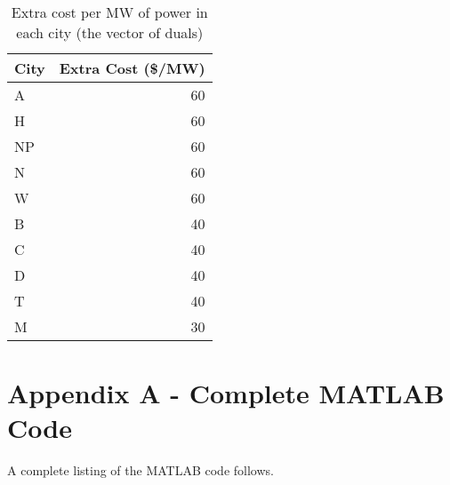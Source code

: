 \documentclass[11pt]{article}
\begin{document}
\begin{table}[h]
	\centering
	\begin{tabular}{@{}lr@{}}
	\toprule
	City & Extra Cost (\$/MW) \\ \midrule
	A       & 60              \\
	H       & 60              \\
	NP      & 60              \\
	N       & 60              \\
	W       & 60              \\
	B       & 40              \\
	C       & 40              \\
	D       & 40              \\
	T       & 40              \\
	M       & 30              \\ \bottomrule
	\end{tabular}
	\caption{Extra cost per MW of power in each city (the vector of duals)}
\end{table}

\newpage\phantom{hi marker :)}

\newpage
\section*{Appendix A - Complete MATLAB Code}
A complete listing of the MATLAB code follows. 

\inputminted{matlab}{main.m}
\end{document}
